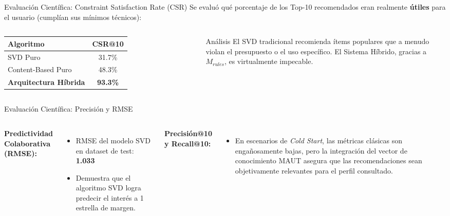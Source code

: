 \documentclass[aspectratio=169]{beamer}
\begin{document}
\begin{frame}{Evaluación Científica: Constraint Satisfaction Rate (CSR)}
    Se evaluó qué porcentaje de los Top-10 recomendados eran realmente \textbf{útiles} para el usuario (cumplían sus mínimos técnicos):
    
    \vspace{0.4cm}
    \begin{columns}
        \begin{table}
            \centering
            \begin{tabular}{lc}
                \toprule
                \textbf{Algoritmo} & \textbf{CSR@10} \\
                \midrule
                SVD Puro & 31.7\% \\
                Content-Based Puro & 48.3\% \\
                \textbf{Arquitectura Híbrida} & \textbf{93.3\%} \\
                \bottomrule
            \end{tabular}
        \end{table}
        
        \begin{block}{Análisis}
        El SVD tradicional recomienda ítems populares que a menudo violan el presupuesto o el uso específico. El Sistema Híbrido, gracias a $M_{rules}$, es virtualmente impecable.
        \end{block}
    \end{columns}
\end{frame}

\begin{frame}{Evaluación Científica: Precisión y RMSE}
    \begin{columns}
        \textbf{Predictividad Colaborativa (RMSE):}
        \begin{itemize}
            \item RMSE del modelo SVD en dataset de test: \textbf{1.033}
            \item Demuestra que el algoritmo SVD logra predecir el interés a 1 estrella de margen.
        \end{itemize}
        
        \textbf{Precisión@10 y Recall@10:}
        \begin{itemize}
            \item En escenarios de \textit{Cold Start}, las métricas clásicas son engañosamente bajas, pero la integración del vector de conocimiento MAUT asegura que las recomendaciones sean objetivamente relevantes para el perfil consultado.
        \end{itemize}
    \end{columns}
\end{frame}
\end{document}

